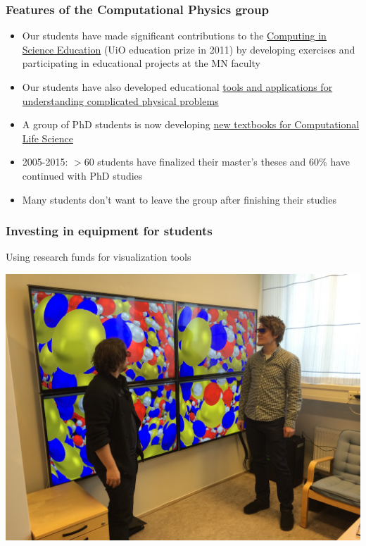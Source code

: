 \documentclass{beamer}
\begin{document}
\begin{frame}
\frametitle{Features of the Computational Physics group}

\begin{block}{}
\begin{itemize}
\item Our students have made significant contributions to  the \href{{http://www.mn.uio.no/english/about/collaboration/cse/}}{Computing in Science Education}  (UiO education prize in 2011) by developing exercises and participating in educational projects at the MN faculty

\item Our students have also developed educational \href{{http://www.mn.uio.no/fysikk/om/aktuelt/aktuelle-saker/2015/realfagsapper.html}}{tools and applications for understanding complicated physical problems}

\item A group of PhD students is now developing \href{{https://github.com/CINPLA/ibvcse}}{new textbooks for Computational Life Science}

\item 2005-2015: $> 60$ students have finalized their master's theses and 60\% have continued with PhD studies

\item Many students don't want to leave the group after finishing their studies
\end{itemize}

\noindent
\end{block}
\end{frame}

\begin{frame}
\frametitle{Investing in equipment for students}

\begin{block}{Using research funds for visualization tools }


\centerline{\includegraphics[width=0.7\linewidth]{fig-future/visualize.jpg}}



\end{block}
\end{frame}
\end{document}
